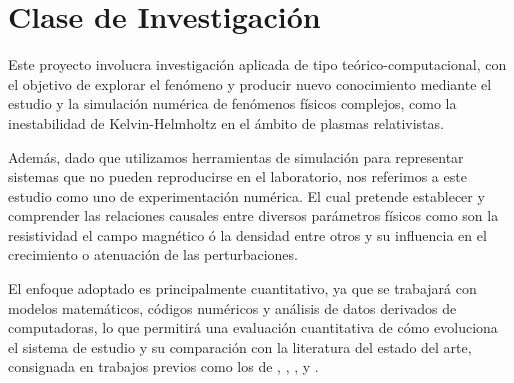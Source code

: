\newpage
\section{Clase de Investigación}
\noindent Este proyecto involucra investigación aplicada de tipo teórico-computacional, con el objetivo de explorar el fenómeno y producir nuevo conocimiento mediante el estudio y la simulación numérica de fenómenos físicos complejos, como la inestabilidad de Kelvin-Helmholtz en el ámbito de plasmas relativistas.

Además, dado que utilizamos herramientas de simulación para representar sistemas que no pueden reproducirse en el laboratorio, nos referimos a este estudio como uno de experimentación numérica. El cual pretende establecer y comprender las relaciones causales entre diversos parámetros físicos como son la resistividad el campo magnético ó la densidad entre otros y su influencia en el crecimiento o atenuación de las perturbaciones.

El enfoque adoptado es principalmente cuantitativo, ya que se trabajará con modelos matemáticos, códigos numéricos y análisis de datos derivados de computadoras, lo que permitirá una evaluación cuantitativa de cómo evoluciona el sistema de estudio y su comparación con la literatura del estado del arte, consignada en trabajos previos como los de \citep{mizuno-2013}, \citep{pimentel-2019}, \citep{la-rosa-2016}, \citep{tian-2016} y \citep{gomes-2017}.

